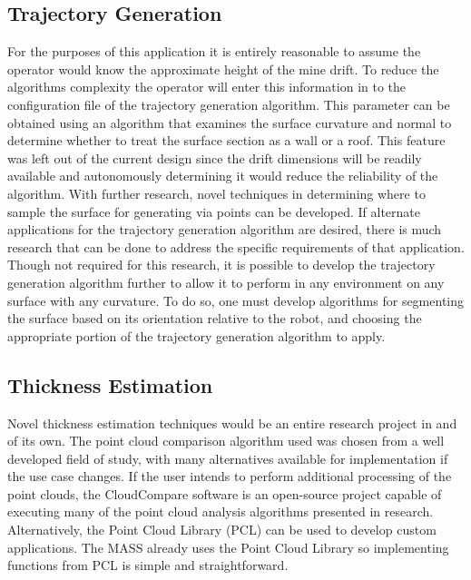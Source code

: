 \subsection{Trajectory Generation}

For the purposes of this application it is entirely reasonable to assume the operator would know the approximate height of the mine drift. To reduce the algorithms complexity the operator will enter this information in to the configuration file of the trajectory generation algorithm. This parameter can be obtained using an algorithm that examines the surface curvature and normal to determine whether to treat the surface section as a wall or a roof. This feature was left out of the current design since the drift dimensions will be readily available and autonomously determining it would reduce the reliability of the algorithm. With further research, novel techniques in determining where to sample the surface for generating via points can be developed. If alternate applications for the trajectory generation algorithm are desired, there is much research that can be done to address the specific requirements of that application. Though not required for this research, it is possible to develop the trajectory generation algorithm further to allow it to perform in any environment on any surface with any curvature. To do so, one must develop algorithms for segmenting the surface based on its orientation relative to the robot, and choosing the appropriate portion of the trajectory generation algorithm to apply.\\

\subsection{Thickness Estimation}

Novel thickness estimation techniques would be an entire research project in and of its own. The point cloud comparison algorithm used was chosen from a well developed field of study, with many alternatives available for implementation if the use case changes. If the user intends to perform additional processing of the point clouds, the CloudCompare software is an open-source project capable of executing many of the point cloud analysis algorithms presented in research. Alternatively, the Point Cloud Library (PCL) can be used to develop custom applications. The MASS already uses the Point Cloud Library so implementing functions from PCL is simple and straightforward.\\
